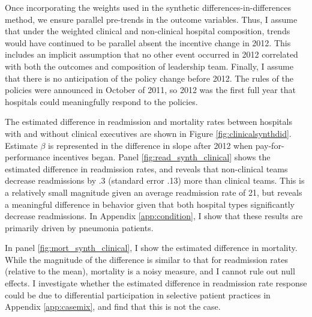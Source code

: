 \documentclass[12pt]{article}
\begin{document}
    Once incorporating the weights used in the synthetic differences-in-differences method, we ensure parallel pre-trends in the outcome variables. Thus, I assume that under the weighted clinical and non-clinical hospital composition, trends would have continued to be parallel absent the incentive change in 2012. This includes an implicit assumption that no other event occurred in 2012 correlated with both the outcomes and composition of leadership team. Finally, I assume that there is no anticipation of the policy change before 2012. The rules of the policies were announced in October of 2011, so 2012 was the first full year that hospitals could meaningfully respond to the policies.

    The estimated difference in readmission and mortality rates between hospitals with and without clinical executives are shown in Figure \ref{fig:clinicalsynthdid}. Estimate $\beta$ is represented in the difference in slope after 2012 when pay-for-performance incentives began. Panel \ref{fig:read_synth_clinical} shows the estimated difference in readmission rates, and reveals that non-clinical teams decrease readmissions by .3 (standard error .13) more than clinical teams. This is a relatively small magnitude given an average readmission rate of 21, but reveals a meaningful difference in behavior given that both hospital types significantly decrease readmissions. In Appendix \ref{app:condition}, I show that these results are primarily driven by pneumonia patients. 
    
    In panel \ref{fig:mort_synth_clinical}, I show the estimated difference in mortality. While the magnitude of the difference is similar to that for readmission rates (relative to the mean), mortality is a noisy measure, and I cannot rule out null effects. I investigate whether the estimated difference in readmission rate response could be due to differential participation in selective patient practices in Appendix \ref{app:casemix}, and find that this is not the case. 
\end{document}
